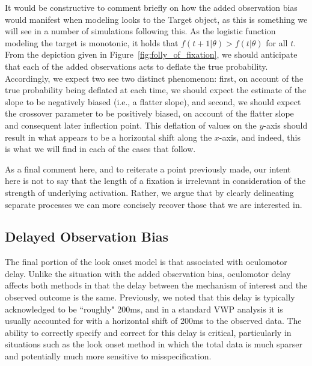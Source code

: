 \documentclass{article}
\begin{document}
It would be constructive to comment briefly on how the added observation bias would manifest when modeling looks to the Target object, as this is something we will see in a number of simulations following this. As the logistic function modeling the target is monotonic, it holds that $f(t+1|\theta) > f(t | \theta)$ for all $t$. From the depiction given in Figure~\ref{fig:folly_of_fixation}, we should anticipate that each of the added observations acts to deflate the true probability. Accordingly, we expect two see two distinct phenomenon: first, on account of the true probability being deflated at each time, we should expect the estimate of the slope to be negatively biased (i.e., a flatter slope), and second, we should expect the crossover parameter to be positively biased, on account of the flatter slope and consequent later inflection point. This deflation of values on the $y$-axis should result in what appears to be a horizontal shift along the $x$-axis, and indeed, this is what we will find in each of the cases that follow.

As a final comment here, and to reiterate a point previously made, our intent here is not to say that the length of a fixation is irrelevant in consideration of the strength of underlying activation. Rather, we argue that by clearly delineating separate processes we can more concisely recover those that we are interested in.  



\subsection{Delayed Observation Bias}


The final portion of the look onset model is that associated with oculomotor delay. Unlike the situation with the added observation bias, oculomotor delay affects both methods in that the delay between the mechanism of interest and the observed outcome is the same. Previously, we noted that this delay is typically acknowledged to be ``roughly" 200ms, and in a standard VWP analysis it is usually accounted for with a horizontal shift of 200ms to the observed data. The ability to correctly specify and correct for this delay is critical, particularly in situations such as the look onset method in which the total data is much sparser and potentially much more sensitive to misspecification. 
\end{document}
